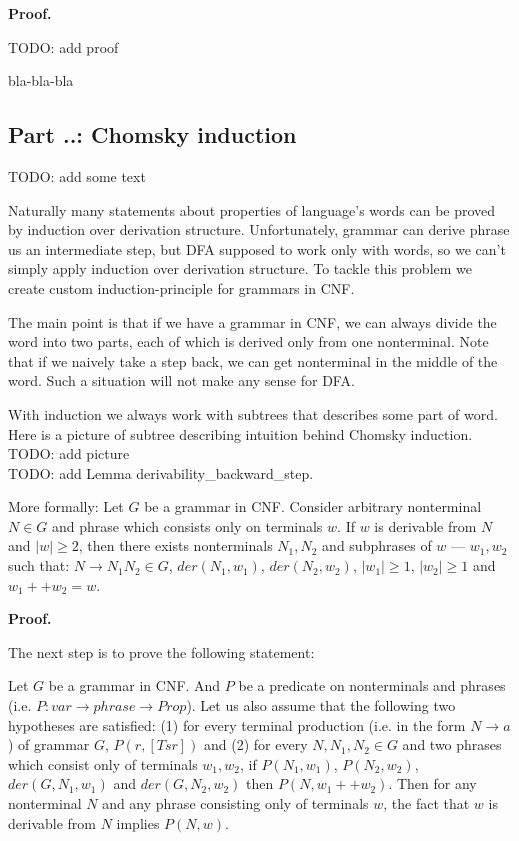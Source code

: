 \textbf{Proof.}

TODO: add proof

bla-bla-bla


\subsection{Part ..: Chomsky induction}
TODO: add some text

Naturally many statements about properties of language's words can be proved by induction over derivation structure. Unfortunately, grammar can derive phrase us an intermediate step, but DFA supposed to work only with words, so we can’t simply apply induction over derivation structure. To tackle this problem we create custom induction-principle for grammars in CNF.

The main point is that if we have a grammar in CNF, we can always divide the word into two parts, each of which is derived only from one nonterminal. Note that if we naively take a step back, we can get nonterminal in the middle of the word. Such a situation will not make any sense for DFA.

With induction we always work with subtrees that describes some part of word. Here is a picture of subtree describing intuition behind Chomsky induction. \\
TODO: add picture\\ 
TODO: add Lemma derivability\_backward\_step.

More formally: 
Let $G$ be a grammar in CNF. Consider arbitrary nonterminal $N \in G$ and phrase which consists only on terminals $w$. 
If $w$ is derivable from $N$ and $|w| \ge 2$, then there exists nonterminals $N_1, N_2$ and subphrases of $w$ --- $w_1, w_2$ such that: $N \to N_1 N_2 \in G$, $der(N_1, w_1)$, $der(N_2, w_2)$, $|w_1| \ge 1$, $|w_2| \ge 1$ and $w_1 ++ w_2 = w$.

\textbf{Proof.}

The next step is to prove the following statement:

Let $G$ be a grammar in CNF. And $P$ be a predicate on nonterminals and phrases (i.e. $P: var \to phrase \to Prop$).
Let us also assume that the following two hypotheses are satisfied:
(1) for every terminal production (i.e. in the form $N \to a$) of grammar $G$, $P(r, [Ts r])$ and (2) for every $N, N_1, N_2 \in G$ and two phrases which consist only of terminals $w_1, w_2$, if $P(N_1, w_1)$, $P(N_2, w_2)$, $der(G, N_1, w_1)$ and $der(G, N_2, w_2)$ then $P(N, w_1 ++ w_2)$.
Then for any nonterminal $N$ and any phrase consisting only of terminals $w$, the fact that $w$ is derivable from $N$ implies $P(N,w)$.

